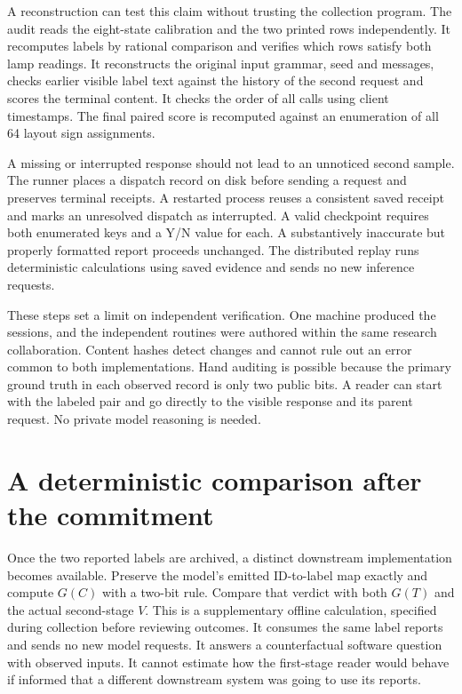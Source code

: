 \documentclass[12pt,letterpaper]{article}
\begin{document}
A reconstruction can test this claim without trusting the collection program. The audit reads the eight-state calibration and the two printed rows independently. It recomputes labels by rational comparison and verifies which rows satisfy both lamp readings. It reconstructs the original input grammar, seed and messages, checks earlier visible label text against the history of the second request and scores the terminal content. It checks the order of all calls using client timestamps. The final paired score is recomputed against an enumeration of all 64 layout sign assignments.

A missing or interrupted response should not lead to an unnoticed second sample. The runner places a dispatch record on disk before sending a request and preserves terminal receipts. A restarted process reuses a consistent saved receipt and marks an unresolved dispatch as interrupted. A valid checkpoint requires both enumerated keys and a Y/N value for each. A substantively inaccurate but properly formatted report proceeds unchanged. The distributed replay runs deterministic calculations using saved evidence and sends no new inference requests.

These steps set a limit on independent verification. One machine produced the sessions, and the independent routines were authored within the same research collaboration. Content hashes detect changes and cannot rule out an error common to both implementations. Hand auditing is possible because the primary ground truth in each observed record is only two public bits. A reader can start with the labeled pair and go directly to the visible response and its parent request. No private model reasoning is needed.

\section{A deterministic comparison after the commitment}
Once the two reported labels are archived, a distinct downstream implementation becomes available. Preserve the model's emitted ID-to-label map exactly and compute $G(C)$ with a two-bit rule. Compare that verdict with both $G(T)$ and the actual second-stage $V$. This is a supplementary offline calculation, specified during collection before reviewing outcomes. It consumes the same label reports and sends no new model requests. It answers a counterfactual software question with observed inputs. It cannot estimate how the first-stage reader would behave if informed that a different downstream system was going to use its reports.
\end{document}

